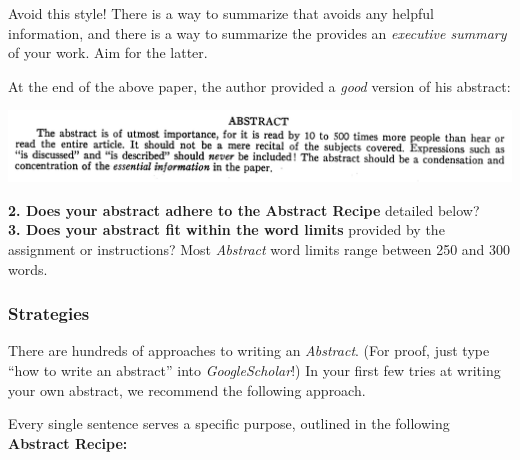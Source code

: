 \documentclass[
]{book}
\begin{document}
Avoid this style! There is a way to summarize that avoids any helpful information, and there is a way to summarize the provides an \emph{executive summary} of your work. Aim for the latter.

At the end of the above paper, the author provided a \emph{good} version of his abstract:

\includegraphics{img/abstracts-good.png}

\textbf{2. Does your abstract adhere to the Abstract Recipe} detailed below?\\
\textbf{3. Does your abstract fit within the word limits} provided by the assignment or instructions? Most \emph{Abstract} word limits range between 250 and 300 words.

\hypertarget{strategies}{%
\subsubsection*{Strategies}\label{strategies}}

There are hundreds of approaches to writing an \emph{Abstract}. (For proof, just type ``how to write an abstract'' into \emph{GoogleScholar}!) In your first few tries at writing your own abstract, we recommend the following approach.

Every single sentence serves a specific purpose, outlined in the following \textbf{Abstract Recipe:}
\end{document}
